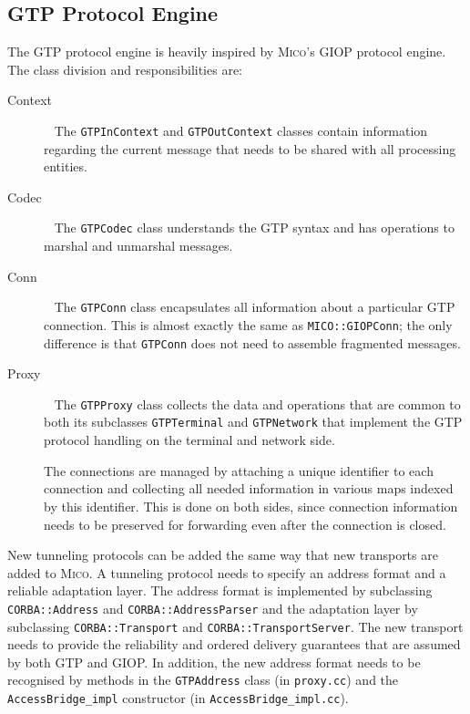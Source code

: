 \documentclass[12pt,a4paper,draft]{article}
\newcommand{\MICO}{\textsc{Mico}}
\begin{document}
\subsection{GTP Protocol Engine}
\label{sec:gtp}

The GTP protocol engine is heavily inspired by \MICO{}'s GIOP protocol
engine.  The class division and responsibilities are:
\begin{description}
\item[Context]
  ~\newline
  The \texttt{GTPInContext} and \texttt{GTPOutContext} classes contain
  information regarding the current message that needs to be shared
  with all processing entities.
\item[Codec]
  ~\newline
  The \texttt{GTPCodec} class understands the GTP syntax and has
  operations to marshal and unmarshal messages.
\item[Conn]
  ~\newline
  The \texttt{GTPConn} class encapsulates all information about a
  particular GTP connection.  This is almost exactly the same as
  \texttt{MICO::GIOPConn}; the only difference is that
  \texttt{GTPConn} does not need to assemble fragmented messages.
\item[Proxy]
  ~\newline
  The \texttt{GTPProxy} class collects the data and operations that
  are common to both its subclasses \texttt{GTPTerminal} and
  \texttt{GTPNetwork} that implement the GTP protocol handling on the
  terminal and network side.

  The connections are managed by attaching a unique identifier to each
  connection and collecting all needed information in various maps
  indexed by this identifier.  This is done on both sides, since
  connection information needs to be preserved for forwarding even
  after the connection is closed.
\end{description}

New tunneling protocols can be added the same way that new transports
are added to \MICO{}.  A tunneling protocol needs to specify an
address format and a reliable adaptation layer.  The address format is
implemented by subclassing \texttt{CORBA::Address} and
\texttt{CORBA::AddressParser} and the adaptation layer by subclassing
\texttt{CORBA::Transport} and \texttt{CORBA::TransportServer}.  The
new transport needs to provide the reliability and ordered delivery
guarantees that are assumed by both GTP and GIOP.  In addition, the
new address format needs to be recognised by methods in the
\texttt{GTPAddress} class (in \texttt{proxy.cc}) and the
\texttt{AccessBridge\_impl} constructor (in
\texttt{AccessBridge\_impl.cc}).
\end{document}
